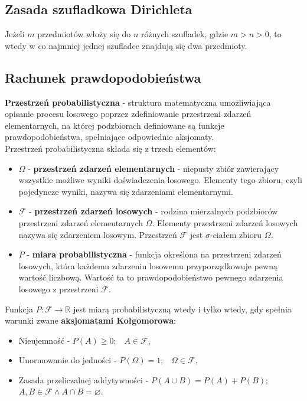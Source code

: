 \documentclass[14pt,a4paper]{extarticle}
\begin{document}
\subsection{Zasada szufladkowa Dirichleta}
Jeżeli $m$ przedmiotów włoży się do $n$ różnych szufladek, gdzie $m > n > 0$, to wtedy w co najmniej
jednej szufladce znajdują się dwa przedmioty. 

\subsection{Rachunek prawdopodobieństwa}
\noindent \textbf{Przestrzeń probabilistyczna} - struktura matematyczna umożliwiająca opisanie
procesu losowego poprzez zdefiniowanie przestrzeni zdarzeń elementarnych, na której podzbiorach
definiowane są funkcje prawdopodobieństwa, spełniające odpowiednie aksjomaty.\\
Przestrzeń probabilistyczna składa się z trzech elementów:
\begin{itemize}
   \item $\Omega$ - \textbf{przestrzeń zdarzeń elementarnych} - niepusty zbiór zawierający
   wszystkie możliwe wyniki doświadczenia losowego. Elementy tego zbioru, czyli pojedyncze
   wyniki, nazywa się zdarzeniami elementarnymi.
   \item $\mathcal{F}$ - \textbf{przestrzeń zdarzeń losowych} - rodzina mierzalnych podzbiorów przestrzeni
   zdarzeń elementarnych $\Omega$. Elementy przestrzeni zdarzeń losowych nazywa się zdarzeniem
   losowym. Przestrzeń $\mathcal{F}$ jest $\sigma$-ciałem zbioru $\Omega$.
   \item $P$ - \textbf{miara probabilistyczna} - funkcja określona na przestrzeni zdarzeń losowych,
   która każdemu zdarzeniu losowemu przyporządkowuje pewną wartość liczbową. Wartość ta to prawdopodobieństwo
   pewnego zdarzenia losowego z przestrzeni $\mathcal{F}$.
\end{itemize}

\noindent Funkcja $P:\mathcal{F}\rightarrow\mathbb{R}$ jest miarą probabilistyczną wtedy i tylko
wtedy, gdy spełnia warunki zwane \textbf{aksjomatami Kołgomorowa}:
\begin{itemize}
   \item Nieujemność - $P(A) \geq 0;\;\;\; A \in \mathcal{F}$,
   \item Unormowanie do jedności - $P(\Omega) = 1; \;\;\; \Omega \in \mathcal{F}$,
   \item Zasada przeliczalnej addytywności - $P(A \cup B) = P(A) + P(B);$\\
   $A, B \in \mathcal{F} \land A \cap B = \varnothing$.
\end{itemize}
\end{document}

